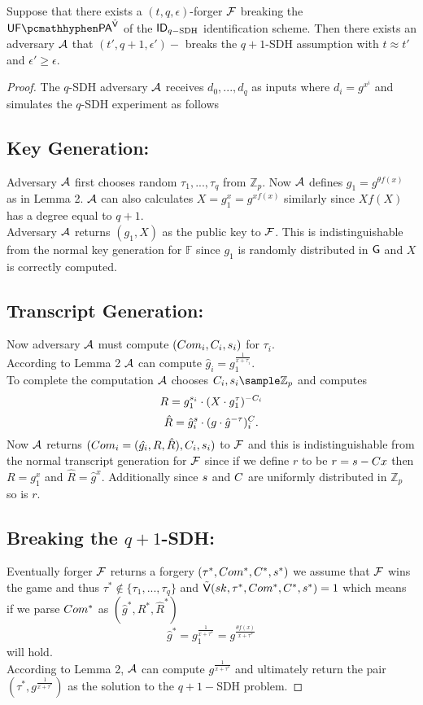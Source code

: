\begin{theorem}
Suppose that there exists a $(t, q, \epsilon)$-forger $\mathcal{F}$ breaking the $\imp^{\IDAltV}$ of the $\mathsf{ID}_{q-\text{SDH}}$ identification scheme. Then there exists an adversary $\mathcal{A}$ that $(t',q+1,\epsilon')-$ breaks the $q+1$-SDH assumption with $t \approx t'$ and 
$\epsilon' \geq \epsilon.$
\end{theorem}
\begin{proof}
The $q$-SDH adversary $\mathcal{A}$ receives $d_0,...,d_q$ as inputs where $d_i = g^{x^i}$ and simulates the $q$-SDH experiment as follows
\subsection*{Key Generation:} 
Adversary $\mathcal{A}$ first chooses random $\tau_1,...,\tau_q$ from $\mathbb{Z}_p$. Now $\mathcal{A}$ defines $g_1 = g^{\theta f(x)}$ as in Lemma 2. $\mathcal{A}$ can also calculates 
$X = g_1^x = g^{xf(x)}$ similarly since $Xf(X)$ has a degree equal to $q+1$.
\\
Adversary $\mathcal{A}$ returns $(g_1,X)$ as the public key to $\mathcal{F}$. This is indistinguishable from the normal key generation for $\mathbb{F}$ since $g_1$ is randomly distributed in $\mathsf{G}$ and $X$ is correctly computed.

\subsection*{Transcript Generation:}
Now adversary $\mathcal{A}$ must compute $(Com_i,C_i,s_i)$ for $\tau_i$.
\\
According to Lemma 2 $\mathcal{A}$ can compute $\hat{g}_i = g_1^{\frac{1}{x+\tau_i}}$.
\\
To complete the computation $\mathcal{A}$ chooses  $\c_i,\s_i\sample\mathbb{Z}_p$ and computes
$$R = g_1^{s_i }\cdot(X\cdot g_1^{\tau})^{-C_i} $$
$$\hat{R} = \hat{g}^s_i \cdot (g\cdot \hat{g}^{-\tau} )^C_i.$$
Now $\mathcal{A}$ returns $(Com_i = (\hat{g_i},R,\hat{R}),C_i,s_i)$ to $\mathcal{F}$ and this is indistinguishable from the normal transcript generation for $\mathcal{F}$ since if we define $r$ to be $r = s-C x$ then $R = g_1^x$ and 
$\hat{R} = \hat{g}^x$. Additionally since $s$ and $C$ are uniformly distributed in $\mathbb{Z}_p$ so is $r$.
\subsection*{Breaking the $q+1$-SDH:}
Eventually forger $\mathcal{F}$ returns a forgery $(\tau^*,Com^*,C^*,s^*)$ we assume that $\mathcal{F}$ wins the game and thus $\tau^* \notin \{\tau_1,...,\tau_q\}$ and 
$\tilde{\mathsf{V}}(sk, \tau^*,Com^*,C^*,s^*) = 1$ which means if we parse $Com^*$ as $(\hat{g}^*,R^*,\hat{R}^*)$ 
$$\hat{g}^* = g_1^{\frac{1}{x+\tau^*}} = g^{\frac{\theta f(x)}{x+\tau^*}}$$
will hold.
\\
According to Lemma 2, $\mathcal{A}$ can compute 
$ g^{\frac{1}{x+ \tau^*}}$
and ultimately return the pair $(\tau^*, g^{\frac{1}{x+ \tau^*}})$ as the solution to the $q+1-$SDH problem.

\end{proof}  